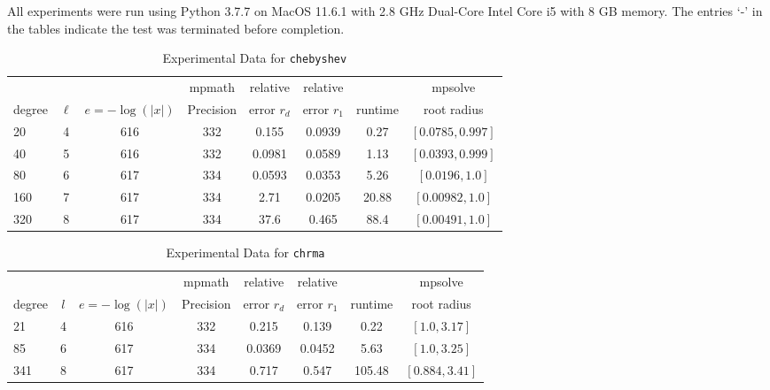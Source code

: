 \documentclass[sigconf]{acmart}
\begin{document}
All experiments were run using Python 3.7.7 on MacOS 11.6.1 with 2.8 GHz Dual-Core Intel Core i5 with 8 GB memory.  The entries `-' in the tables indicate the test was terminated before completion.

\begin{table}[t]
\caption{Experimental Data for \texttt{chebyshev}} %
\label{tab:chebyshev}
\vskip -0.15in
\begin{center}
\begin{small}
\begin{sc}
\begin{tabular}{lccccccc}
\toprule
&  &  & mpmath & relative  & relative &  & mpsolve \\
degree  & $\ell$& $e=-\log(|x|)$& Precision &error $r_d$       & error $r_1$ &runtime& root radius\\
\midrule
 20 & 4 & 616 & 332 & 0.155 & 0.0939 & 0.27 & $[0.0785, 0.997]$\\
 40 & 5 & 616 & 332 & 0.0981 & 0.0589 & 1.13 & $[0.0393, 0.999]$\\
 80 & 6 & 617 & 334 & 0.0593 & 0.0353 & 5.26 & $[0.0196, 1.0]$\\
 160 & 7 & 617 & 334 & 2.71 & 0.0205 & 20.88 & $[0.00982, 1.0]$\\
 320 & 8 & 617 & 334 & 37.6 & 0.465 & 88.4 & $[0.00491, 1.0]$\\
\bottomrule
\end{tabular}
\end{sc}
\end{small}
\end{center}
\vskip 0.05in
\end{table}

\begin{table}[t]
\caption{Experimental Data for \texttt{chrma}} %
\label{tab:chrma}
\vskip -0.15in
\begin{center}
\begin{small}
\begin{sc}
\begin{tabular}{lccccccc}
\toprule
&  &  & mpmath & relative  & relative &  & mpsolve \\
degree  & $l$& $e=-\log(|x|)$& Precision &error $r_d$       & error $r_1$ &runtime& root radius\\
\midrule
 21 & 4 & 616 & 332 & 0.215 & 0.139 & 0.22 & $[1.0, 3.17]$\\
 85 & 6 & 617 & 334 & 0.0369 & 0.0452 & 5.63 & $[1.0, 3.25]$\\
 341 & 8 & 617 & 334 & 0.717 & 0.547 & 105.48 & $[0.884, 3.41]$\\
\bottomrule
\end{tabular}
\end{sc}
\end{small}
\end{center}
\vskip 0.05in
\end{table}
\end{document}
